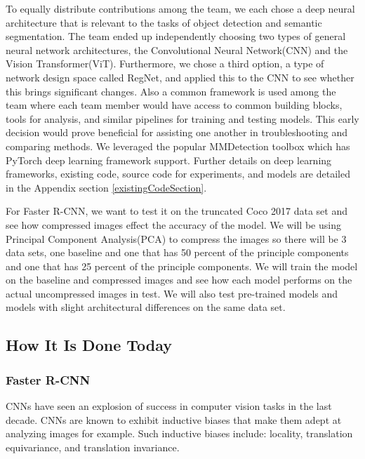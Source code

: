 \documentclass[10pt,twocolumn,letterpaper]{article}
\begin{document}
To equally distribute contributions among the team, we each chose a deep neural architecture that is relevant to the tasks of object detection and semantic segmentation. The team ended up independently choosing two types of general neural network architectures, the Convolutional Neural Network(CNN) and the Vision Transformer(ViT)\cite{dosovitskiy2020image}. Furthermore, we chose a third option, a type of network design space called RegNet, and applied this to the CNN to see whether this brings significant changes. Also a common framework is used among the team where each team member would have access to common building blocks, tools for analysis, and similar pipelines for training and testing models. This early decision would prove beneficial for assisting one another in troubleshooting and comparing methods. We leveraged the popular MMDetection\cite{mmdetection} toolbox which has PyTorch deep learning framework support. Further details on deep learning frameworks, existing code, source code for experiments, and models are detailed in the Appendix section \ref{existingCodeSection}.

For Faster R-CNN, we want to test it on the truncated Coco 2017 data set and see how compressed images effect the accuracy of the model. We will be using Principal Component Analysis(PCA) to compress the images so there will be 3 data sets, one baseline and one that has 50 percent of the principle components and one that has 25 percent of the principle components. We will train the model on the baseline and compressed images and see how each model performs on the actual uncompressed images in test. We will also test pre-trained models and models with slight architectural differences on the same data set. 


\subsection{How It Is Done Today}

\subsubsection{Faster R-CNN}

CNNs have seen an explosion of success in computer vision tasks in the last decade. CNNs are known to exhibit inductive biases that make them adept at analyzing images for example. Such inductive biases include: locality, translation equivariance, and translation invariance.
\end{document}
